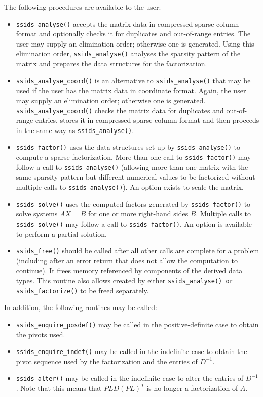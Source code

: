 \documentclass{spral}
\begin{document}
\medskip

\noindent
The following procedures are available to the user:
\begin{itemize}
\item {\tt ssids\_analyse()} accepts the matrix data in compressed
sparse column format and optionally checks it for duplicates and  out-of-range entries.
The user may supply an elimination order; otherwise
one is generated. Using this elimination order,
{\tt ssids\_analyse()} analyses the sparsity pattern of
the matrix and prepares the data structures for the factorization.

 \item {\tt ssids\_analyse\_coord()} is an alternative to
{\tt ssids\_analyse()} that may be used if the user has
the matrix data in coordinate
format. Again, the user may supply an elimination order; otherwise
one is generated. {\tt ssids\_analyse\_coord()}
checks the matrix data  for duplicates and  out-of-range entries,
stores
it in compressed sparse column format and then proceeds
in the same way as {\tt ssids\_analyse()}.

\item {\tt ssids\_factor()} uses the data structures
set up by {\tt ssids\_analyse()} to compute a sparse
factorization. More than one call to  {\tt ssids\_factor()}
may follow a call to {\tt ssids\_analyse()} (allowing more than
one matrix with the same sparsity pattern but different
numerical values to be factorized without multiple calls to
{\tt ssids\_analyse()}).
An option exists to scale the matrix.

\item {\tt ssids\_solve()} uses the computed factors generated
by  {\tt ssids\_factor()}
to solve systems ${AX= B}$
for one or more right-hand sides $B$.
Multiple calls to {\tt ssids\_solve()} may follow a call to
{\tt ssids\_factor()}.
An option is available to perform a partial solution.

\item {\tt ssids\_free()} should be called after all other calls
are complete for a problem (including after an error
return that does not allow the computation
to continue). It frees memory referenced by components of
the derived data types. This routine also allows created by either
{\tt ssids\_analyse() or ssids\_factorize()} to be freed separately.
\end{itemize}

\noindent
In addition, the following routines may be called:
\begin{itemize}
\item {\tt ssids\_enquire\_posdef()} may be called
in the  positive-definite case to obtain the pivots used.
\item {\tt ssids\_enquire\_indef()} may be called
in the indefinite case to obtain the pivot sequence used by the factorization
and the entries of  ${D}^{-1}$.
\item {\tt ssids\_alter()} may be called in the indefinite case to alter
the entries of ${D}^{-1}$.
Note that this means that  $PLD(PL)^T$ is no longer
a factorization of $A$.

\end{itemize}
\end{document}
